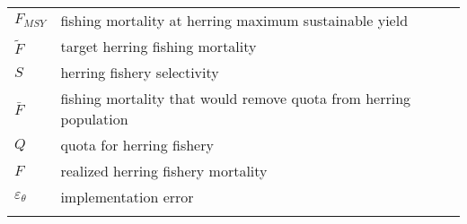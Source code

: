 \documentclass[]{article}
\begin{document}
\begin{longtable}[]{@{}ll@{}}
\begin{minipage}[t]{0.13\columnwidth}
\(F_{MSY}\)\strut
\end{minipage} & \begin{minipage}[t]{0.76\columnwidth}\raggedright\strut
fishing mortality at herring maximum sustainable yield\strut
\end{minipage}\tabularnewline
\begin{minipage}[t]{0.13\columnwidth}\raggedright\strut
\(\tilde{F}\)\strut
\end{minipage} & \begin{minipage}[t]{0.76\columnwidth}\raggedright\strut
target herring fishing mortality\strut
\end{minipage}\tabularnewline
\begin{minipage}[t]{0.13\columnwidth}\raggedright\strut
\(S\)\strut
\end{minipage} & \begin{minipage}[t]{0.76\columnwidth}\raggedright\strut
herring fishery selectivity\strut
\end{minipage}\tabularnewline
\begin{minipage}[t]{0.13\columnwidth}\raggedright\strut
\(\bar{F}\)\strut
\end{minipage} & \begin{minipage}[t]{0.76\columnwidth}\raggedright\strut
fishing mortality that would remove quota from herring population\strut
\end{minipage}\tabularnewline
\begin{minipage}[t]{0.13\columnwidth}\raggedright\strut
\(Q\)\strut
\end{minipage} & \begin{minipage}[t]{0.76\columnwidth}\raggedright\strut
quota for herring fishery\strut
\end{minipage}\tabularnewline
\begin{minipage}[t]{0.13\columnwidth}\raggedright\strut
\(F\)\strut
\end{minipage} & \begin{minipage}[t]{0.76\columnwidth}\raggedright\strut
realized herring fishery mortality\strut
\end{minipage}\tabularnewline
\begin{minipage}[t]{0.13\columnwidth}\raggedright\strut
\(\varepsilon_{\theta}\)\strut
\end{minipage} & \begin{minipage}[t]{0.76\columnwidth}\raggedright\strut
implementation error\strut
\end{minipage}\tabularnewline
\begin{minipage}[t]{0.13\columnwidth}\raggedright\strut

\end{minipage}
\end{longtable}
\end{document}
